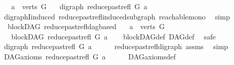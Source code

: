 \begin{isabellebody}
\ \ \ {\isachardoublequoteopen}a\ {\isasymin}\ verts\ G{\isachardoublequoteclose}\isanewline
\ \ \ {\isachardoublequoteopen}digraph\ {\isacharparenleft}{\kern0pt}reduce{\isacharunderscore}{\kern0pt}past{\isacharunderscore}{\kern0pt}refl\ G\ a{\isacharparenright}{\kern0pt}{\isachardoublequoteclose}\isanewline
%
\isadelimproof
\ \ %
\endisadelimproof
%
\isatagproof
{}\isamarkupfalse%
\ digraphI{\isacharunderscore}{\kern0pt}induced\ reduce{\isacharunderscore}{\kern0pt}past{\isacharunderscore}{\kern0pt}refl{\isacharunderscore}{\kern0pt}induced{\isacharunderscore}{\kern0pt}subgraph\ reachable{\isacharunderscore}{\kern0pt}mono\ \isamarkupfalse%
\ simp%
\endisatagproof
{\isafoldproof}%
%
\isadelimproof
\isanewline
%
\endisadelimproof
\isanewline
{}\isamarkupfalse%
\ {\isacharparenleft}{\kern0pt}\ blockDAG{\isacharparenright}{\kern0pt}\ reduce{\isacharunderscore}{\kern0pt}past{\isacharunderscore}{\kern0pt}refl{\isacharunderscore}{\kern0pt}dagbased{\isacharcolon}{\kern0pt}\isanewline
\ \ \ {\isachardoublequoteopen}a\ {\isasymin}\ verts\ G{\isachardoublequoteclose}\isanewline
\ \ \ {\isachardoublequoteopen}blockDAG\ {\isacharparenleft}{\kern0pt}reduce{\isacharunderscore}{\kern0pt}past{\isacharunderscore}{\kern0pt}refl\ G\ a{\isacharparenright}{\kern0pt}{\isachardoublequoteclose}\isanewline
%
\isadelimproof
\ \ %
\endisadelimproof
%
\isatagproof
{}\isamarkupfalse%
\ blockDAG{\isacharunderscore}{\kern0pt}def\ DAG{\isacharunderscore}{\kern0pt}def\ \isanewline
{}\isamarkupfalse%
\ safe\isanewline
\ \ \isamarkupfalse%
\ {\isachardoublequoteopen}digraph\ {\isacharparenleft}{\kern0pt}reduce{\isacharunderscore}{\kern0pt}past{\isacharunderscore}{\kern0pt}refl\ G\ a{\isacharparenright}{\kern0pt}{\isachardoublequoteclose}\isanewline
\ \ \ \ \isamarkupfalse%
\ reduce{\isacharunderscore}{\kern0pt}past{\isacharunderscore}{\kern0pt}refl{\isacharunderscore}{\kern0pt}digraph\ assms{\isacharparenleft}{\kern0pt}{}{\isacharparenright}{\kern0pt}\ \isamarkupfalse%
\ simp\isanewline
{}\isamarkupfalse%
\isanewline
\ \ \isamarkupfalse%
\ {\isachardoublequoteopen}DAG{\isacharunderscore}{\kern0pt}axioms\ {\isacharparenleft}{\kern0pt}reduce{\isacharunderscore}{\kern0pt}past{\isacharunderscore}{\kern0pt}refl\ G\ a{\isacharparenright}{\kern0pt}{\isachardoublequoteclose}\isanewline
\ \ \ \ \isamarkupfalse%
\ DAG{\isacharunderscore}{\kern0pt}axioms{\isacharunderscore}{\kern0pt}def\isanewline

\end{isabellebody}
